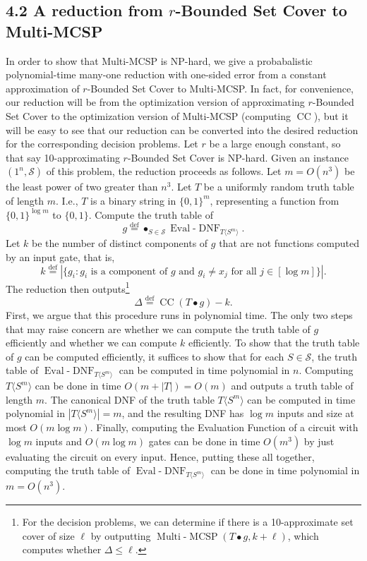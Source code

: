 \documentclass[10pt,a4paper]{article}
\newcommand{\CCirc}{\operatorname{CC}}
\begin{document}
\subsection*{4.2 A reduction from $r$-Bounded Set Cover to Multi-MCSP}
In order to show that Multi-MCSP is NP-hard, we give a probabalistic polynomial-time many-one reduction with one-sided error from a constant approximation of $r$-Bounded Set Cover to Multi-MCSP.
In fact, for convenience, our reduction will be from the optimization version of approximating $r$-Bounded Set Cover to the optimization version of Multi-MCSP (computing $\CCirc$), but it will be easy to see that our reduction can be converted into the desired reduction for the corresponding decision problems.
Let $r$ be a large enough constant, so that say 10-approximating $r$-Bounded Set Cover is NP-hard. Given an instance $(1^n,\mathcal S)$ of this problem, the reduction proceeds as follows. Let $m=O(n^3)$ be the least power of two greater than $n^3$. Let $T$ be a uniformly random truth table of length $m$. I.e., $T$ is a binary string in $\{0,1\}^m$, representing a function from $\{0,1\}^{\log m}$ to $\{0,1\}$. Compute the truth table of
\[g\stackrel{\mathrm{def}}=\mathop{\bullet}_{S\in\mathcal S}\operatorname{Eval}\text{-}\operatorname{DNF}_{T\langle S^m\rangle}.\]
Let $k$ be the number of distinct components of $g$ that are not functions computed by an input gate, that is,
\[k\stackrel{\mathrm{def}}=|\{g_i:g_i\text{ is a component of }g\text{ and }g_i\ne x_j\text{ for all }j\in[\log m]\}|.\]
The reduction then outputs\footnote{For the decision problems, we can determine if there is a 10-approximate set cover of size $\ell$ by outputting $\operatorname{Multi}\text{-}\operatorname{MCSP}(T\bullet g,k+\ell)$, which computes whether $\Delta\leq\ell$.}
\[\Delta\stackrel{\mathrm{def}}=\CCirc(T\bullet g)-k.\]
First, we argue that this procedure runs in polynomial time. The only two steps that may raise concern are whether we can compute the truth table of $g$ efficiently and whether we can compute $k$ efficiently.
To show that the truth table of $g$ can be computed efficiently, it suffices to show that for each $S\in\mathcal S$, the truth table of $\operatorname{Eval}\text{-}\operatorname{DNF}_{T\langle S^m\rangle}$ can be computed in time polynomial in $n$. Computing $T\langle S^m\rangle$ can be done in time $O(m+|T|)=O(m)$ and outputs a truth table of length $m$. The canonical DNF of the truth table $T\langle S^m\rangle$ can be computed in time polynomial in $|T\langle S^m\rangle|=m$, and the resulting DNF has $\log m$ inputs and size at most $O(m\log m)$. Finally, computing the Evaluation Function of a circuit with $\log m$ inputs and $O(m\log m)$ gates can be done in time $O(m^3)$ by just evaluating the circuit on every input. Hence, putting these all together, computing the truth table of $\operatorname{Eval}\text{-}\operatorname{DNF}_{T\langle S^m\rangle}$ can be done in time polynomial in $m=O(n^3)$.
\end{document}
